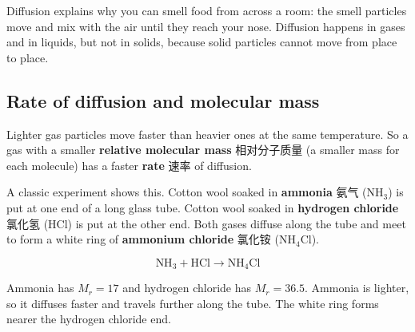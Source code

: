 \documentclass[11pt]{article}
\begin{document}
Diffusion explains why you can smell food from across a room: the smell particles move and mix with the air until they reach your nose. Diffusion happens in gases and in liquids, but not in solids, because solid particles cannot move from place to place.

\subsection*{Rate of diffusion and molecular mass}

Lighter gas particles move faster than heavier ones at the same temperature. So a gas with a smaller \textbf{relative molecular mass} 相对分子质量 (a smaller mass for each molecule) has a faster \textbf{rate} 速率 of diffusion.

A classic experiment shows this. Cotton wool soaked in \textbf{ammonia} 氨气 ($\text{NH}_3$) is put at one end of a long glass tube. Cotton wool soaked in \textbf{hydrogen chloride} 氯化氢 ($\text{HCl}$) is put at the other end. Both gases diffuse along the tube and meet to form a white ring of \textbf{ammonium chloride} 氯化铵 ($\text{NH}_4\text{Cl}$).

\[
\text{NH}_3 + \text{HCl} \rightarrow \text{NH}_4\text{Cl}
\]

Ammonia has $M_r = 17$ and hydrogen chloride has $M_r = 36.5$. Ammonia is lighter, so it diffuses faster and travels further along the tube. The white ring forms nearer the hydrogen chloride end.
\end{document}
